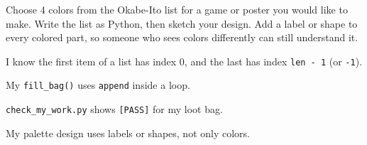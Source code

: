 \begin{creative}
Choose 4 colors from the Okabe-Ito list for a game or poster you would like to make. Write the list as Python, then sketch
your design. Add a label or shape to every colored part, so someone who sees colors differently can still understand it.
\answerspace{3.5cm}
\end{creative}

\begin{selfcheck}
  \item I know the first item of a list has index 0, and the last has index \texttt{len - 1} (or \texttt{-1}).
  \item My \texttt{fill\_bag()} uses \texttt{append} inside a loop.
  \item \texttt{check\_my\_work.py} shows \texttt{[PASS]} for my loot bag.
  \item My palette design uses labels or shapes, not only colors.
\end{selfcheck}
